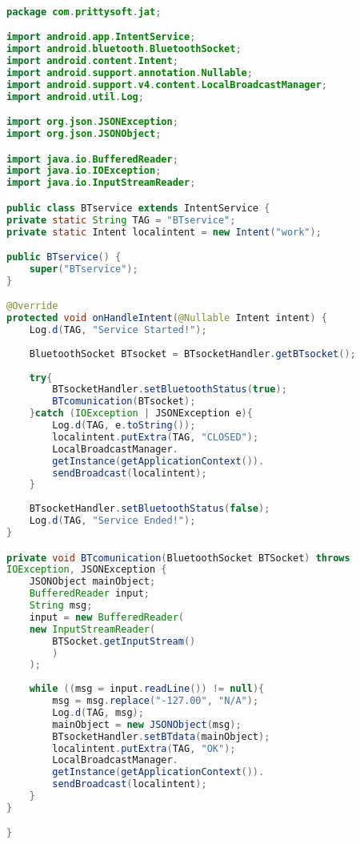 \begin{lstlisting}[language=java, caption={Clase BTService, para actualizar BTSocketHandler y mantener informado a la actividad principal}, captionpos=b, basicstyle=\small]

package com.prittysoft.jat;

import android.app.IntentService;
import android.bluetooth.BluetoothSocket;
import android.content.Intent;
import android.support.annotation.Nullable;
import android.support.v4.content.LocalBroadcastManager;
import android.util.Log;

import org.json.JSONException;
import org.json.JSONObject;

import java.io.BufferedReader;
import java.io.IOException;
import java.io.InputStreamReader;

public class BTservice extends IntentService {
private static String TAG = "BTservice";
private static Intent localintent = new Intent("work");

public BTservice() {
	super("BTservice");
}

@Override
protected void onHandleIntent(@Nullable Intent intent) {
	Log.d(TAG, "Service Started!");
	
	BluetoothSocket BTsocket = BTsocketHandler.getBTsocket();
	
	try{
		BTsocketHandler.setBluetoothStatus(true);
		BTcomunication(BTsocket);
	}catch (IOException | JSONException e){
		Log.d(TAG, e.toString());
		localintent.putExtra(TAG, "CLOSED");
		LocalBroadcastManager.
		getInstance(getApplicationContext()).
		sendBroadcast(localintent);
	}
	
	BTsocketHandler.setBluetoothStatus(false);
	Log.d(TAG, "Service Ended!");
}

private void BTcomunication(BluetoothSocket BTSocket) throws 
IOException, JSONException {
	JSONObject mainObject;
	BufferedReader input;
	String msg;
	input = new BufferedReader(
	new InputStreamReader(
		BTSocket.getInputStream()
		)
	);
	
	while ((msg = input.readLine()) != null){
		msg = msg.replace("-127.00", "N/A");
		Log.d(TAG, msg);
		mainObject = new JSONObject(msg);
		BTsocketHandler.setBTdata(mainObject);
		localintent.putExtra(TAG, "OK");
		LocalBroadcastManager.
		getInstance(getApplicationContext()).
		sendBroadcast(localintent);
	}
}

}

\end{lstlisting}
